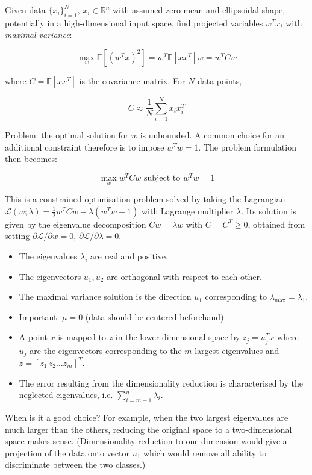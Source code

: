 Given data $\{ x_i \}_{i=1}^N, \, x_i \in \mathbb{R}^n$ with assumed zero mean and ellipsoidal shape,
potentially in a high-dimensional input space,
find projected variables $w^T x_i$ with \textit{maximal variance}:

$$
\max_w{\mathbb{E}[(w^T x)^2]} = w^T \mathbb{E}[x x^T] w = w^T C w
$$

where $C = \mathbb{E}[x x^T]$ is the covariance matrix. For $N$ data points,

$$
C \approx \frac{1}{N} \sum_{i=1}^N{x_i x_i^T}
$$

Problem: the optimal solution for $w$ is unbounded.
A common choice for an additional constraint therefore is to impose $w^T w = 1$.
The problem formulation then becomes:

$$
\max_w{w^T C w} \text{ subject to } w^T w = 1
$$

This is a constrained optimisation problem solved by taking the Lagrangian
$\mathcal{L}(w; \lambda) = \frac{1}{2} w^T C w - \lambda (w^T w - 1)$ with Lagrange multiplier $\lambda$.
Its solution is given by the eigenvalue decomposition $Cw = \lambda w$
with $C = C^T \geq 0$, obtained from setting $\partial \mathcal{L} / \partial w = 0, \, \partial \mathcal{L} / \partial \lambda = 0$.

\begin{itemize}
    \item The eigenvalues $\lambda_i$ are real and positive.
    \item The eigenvectors $u_1, u_2$ are orthogonal with respect to each other.
    \item The maximal variance solution is the direction $u_1$ corresponding to $\lambda_\text{max} = \lambda_1$.
    \item Important: $\mu = 0$ (data should be centered beforehand).
    \item A point $x$ is mapped to $z$ in the lower-dimensional space by $z_j = u_j^T x$ where $u_j$ are the eigenvectors corresponding to the $m$ largest eigenvalues and $z = [z_1 \, z_2 \dots z_m]^T$.
    \item The error resulting from the dimensionality reduction is characterised by the neglected eigenvalues, i.e. $\sum_{i=m+1}^n{\lambda_i}$.
\end{itemize}

When is it a good choice? For example, when the two largest eigenvalues are much larger than the others,
reducing the original space to a two-dimensional space makes sense.
(Dimensionality reduction to one dimension would give a projection of the data onto vector $u_1$
which would remove all ability to discriminate between the two classes.)

